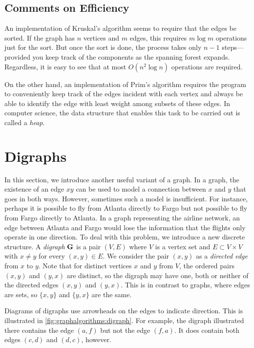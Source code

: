 \subsection{Comments on Efficiency}

An implementation of Kruskal's algorithm seems to require that
the edges be sorted.  If the graph has $n$ vertices and $m$  edges,
this requires $m\log m$ operations just for the sort.  But once
the sort is done, the process takes only $n-1$ steps---provided
you keep track of the components as the spanning forest expands.
Regardless, it is easy to see that at most $O(n^2\log n)$ operations
are required.

On the other hand, an implementation of Prim's algorithm requires
the program to conveniently keep track of the edges incident with
each vertex and always be able to identify the edge with least
weight among subsets of these edges.  In computer science, the
data structure that enables this task to be carried out is called
a \textit{heap}.

\section{Digraphs}

In this section, we introduce another useful variant of a graph. In a
graph, the existence of an edge $xy$ can be used to model a connection
between $x$ and $y$ that goes in both ways. However, sometimes such a
model is insufficient. For instance, perhaps it is possible to fly
from Atlanta directly to Fargo but not possible to fly from Fargo
directly to Atlanta. In a graph representing the airline network, an
edge between Atlanta and Fargo would lose the information that the
flights only operate in one direction. To deal with this problem, we
introduce a new discrete structure. A \textit{digraph} $\mathbf{G}$ is a
pair $(V,E)$ where $V$ is a vertex set and $E\subset V\times V$ with
$x\neq y$ for every $(x,y)\in E$.  We consider the pair $(x,y)$ as a
\textit{directed edge} from $x$ to $y$.  Note that for distinct
vertices $x$ and $y$ from $V$, the ordered pairs $(x,y)$ and $(y,x)$
are distinct, so the digraph may have one, both or neither of the
directed edges $(x,y)$ and $(y,x)$. This is in contrast to graphs,
where edges are sets, so $\{x,y\}$ and $\{y,x\}$ are the same.

Diagrams of digraphs use arrowheads on the edges to indicate direction.
This is illustrated in \autoref{fig:graphalgorithms:digraph}. For
example, the digraph illustrated there contains the edge $(a,f)$ but
not the edge $(f,a)$. It does contain both edges $(c,d)$ and $(d,c)$,
however.

